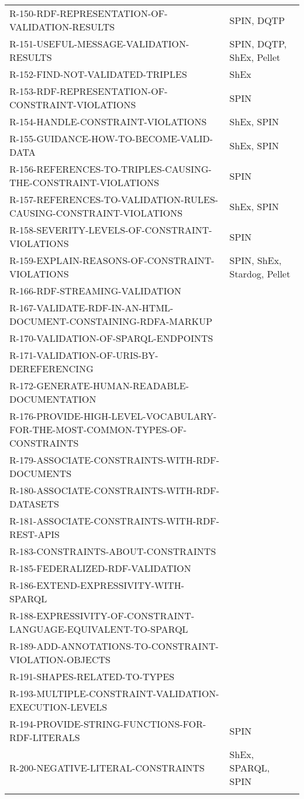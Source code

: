 \documentclass{llncs}
\newcommand{\hr}{\hline\noalign{\smallskip}} %
\begin{document}
\begin{table}
\begin{tabular}{ll}
R-150-RDF-REPRESENTATION-OF-VALIDATION-RESULTS & SPIN, DQTP \\
R-151-USEFUL-MESSAGE-VALIDATION-RESULTS & SPIN, DQTP, ShEx, Pellet \\
R-152-FIND-NOT-VALIDATED-TRIPLES & ShEx \\
R-153-RDF-REPRESENTATION-OF-CONSTRAINT-VIOLATIONS & SPIN \\
R-154-HANDLE-CONSTRAINT-VIOLATIONS & ShEx, SPIN \\
R-155-GUIDANCE-HOW-TO-BECOME-VALID-DATA & ShEx, SPIN \\
R-156-REFERENCES-TO-TRIPLES-CAUSING-THE-CONSTRAINT-VIOLATIONS & SPIN \\
R-157-REFERENCES-TO-VALIDATION-RULES-CAUSING-CONSTRAINT-VIOLATIONS & ShEx, SPIN \\
R-158-SEVERITY-LEVELS-OF-CONSTRAINT-VIOLATIONS & SPIN \\
R-159-EXPLAIN-REASONS-OF-CONSTRAINT-VIOLATIONS & SPIN, ShEx, Stardog, Pellet \\
R-166-RDF-STREAMING-VALIDATION & \\
R-167-VALIDATE-RDF-IN-AN-HTML-DOCUMENT-CONSTAINING-RDFA-MARKUP & \\
R-170-VALIDATION-OF-SPARQL-ENDPOINTS & \\
R-171-VALIDATION-OF-URIS-BY-DEREFERENCING & \\
R-172-GENERATE-HUMAN-READABLE-DOCUMENTATION & \\
R-176-PROVIDE-HIGH-LEVEL-VOCABULARY-FOR-THE-MOST-COMMON-TYPES-OF-CONSTRAINTS & \\
R-179-ASSOCIATE-CONSTRAINTS-WITH-RDF-DOCUMENTS & \\
R-180-ASSOCIATE-CONSTRAINTS-WITH-RDF-DATASETS & \\
R-181-ASSOCIATE-CONSTRAINTS-WITH-RDF-REST-APIS & \\
R-183-CONSTRAINTS-ABOUT-CONSTRAINTS & \\
R-185-FEDERALIZED-RDF-VALIDATION & \\
R-186-EXTEND-EXPRESSIVITY-WITH-SPARQL & \\
R-188-EXPRESSIVITY-OF-CONSTRAINT-LANGUAGE-EQUIVALENT-TO-SPARQL & \\
R-189-ADD-ANNOTATIONS-TO-CONSTRAINT-VIOLATION-OBJECTS & \\
R-191-SHAPES-RELATED-TO-TYPES & \\
R-193-MULTIPLE-CONSTRAINT-VALIDATION-EXECUTION-LEVELS & \\
R-194-PROVIDE-STRING-FUNCTIONS-FOR-RDF-LITERALS & SPIN \\
R-200-NEGATIVE-LITERAL-CONSTRAINTS & ShEx, SPARQL, SPIN \\
\hr
\end{tabular}
\end{table}
\end{document}
